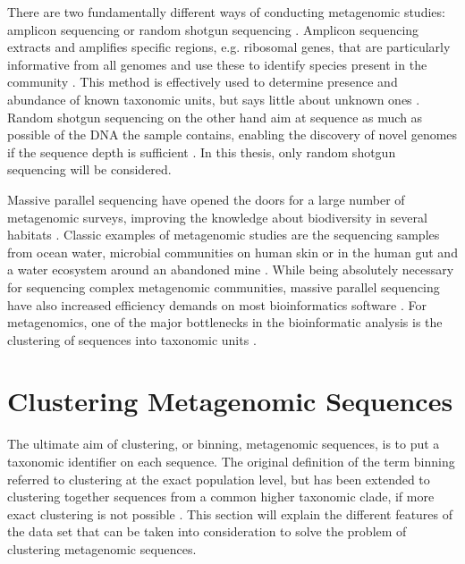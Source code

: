 There are two fundamentally different ways of conducting metagenomic studies: amplicon sequencing or random shotgun sequencing \parencite{Droge2012}. Amplicon sequencing extracts and amplifies specific regions, e.g. ribosomal genes, that are particularly informative from all genomes and use these to identify species present in the community \parencite{Droge2012}. This method is effectively used to determine presence and abundance of known taxonomic units, but says little about unknown ones \parencite{Droge2012}. Random shotgun sequencing on the other hand aim at sequence as much as possible of the DNA the sample contains, enabling the discovery of novel genomes if the sequence depth is sufficient \parencite{Droge2012}. In this thesis, only random shotgun sequencing will be considered.

Massive parallel sequencing have opened the doors for a large number of metagenomic surveys, improving the knowledge about biodiversity in several habitats \parencite{Weber2011}. Classic examples of metagenomic studies are the sequencing samples from ocean water, microbial communities on human skin or in the human gut and a water ecosystem around an abandoned mine \parencite{Kelley2010}. While being absolutely necessary for sequencing complex metagenomic communities, massive parallel sequencing have also increased efficiency demands on most bioinformatics software \parencite{Droge2012}. For metagenomics, one of the major bottlenecks in the bioinformatic analysis is the clustering of sequences into taxonomic units \parencite{Strous2012a}.

\section{Clustering Metagenomic Sequences}
The ultimate aim of clustering, or binning, metagenomic sequences, is to put a taxonomic identifier on each sequence. The original definition of the term binning referred to clustering at the exact population level, but has been extended to clustering together sequences from a common higher taxonomic clade, if more exact clustering is not possible \parencite{Droge2012}. This section will explain the different features of the data set that can be taken into consideration to solve the problem of clustering metagenomic sequences. 


